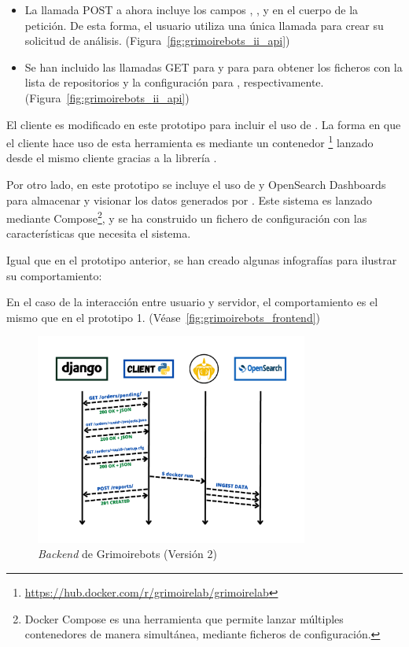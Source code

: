 \begin{itemize}
    \item La llamada POST a  ahora incluye los campos , , y  en el cuerpo de la petición. De esta forma, el usuario utiliza una única llamada para crear su solicitud de análisis. (Figura~\ref{fig:grimoirebots_ii_api})
    \item Se han incluido las llamadas GET para  y para  para obtener los ficheros con la lista de repositorios y la configuración para , respectivamente. (Figura~\ref{fig:grimoirebots_ii_api})
\end{itemize}

El cliente es modificado en este prototipo para incluir el uso de . La forma en que el cliente hace uso de esta herramienta es mediante un contenedor \footnote{\url{https://hub.docker.com/r/grimoirelab/grimoirelab}} lanzado desde el mismo cliente gracias a la librería .

Por otro lado, en este prototipo se incluye el uso de  y OpenSearch Dashboards para almacenar y visionar los datos generados por . Este sistema es lanzado mediante  Compose\footnote{Docker Compose es una herramienta que permite lanzar múltiples contenedores de manera simultánea, mediante ficheros de configuración.}, y se ha construido un fichero de configuración con las características que necesita el sistema.

Igual que en el prototipo anterior, se han creado algunas infografías para ilustrar su comportamiento:

En el caso de la interacción entre usuario y servidor, el comportamiento es el mismo que en el prototipo 1. (Véase~\ref{fig:grimoirebots_frontend})

\begin{figure}[ht]
    \centering
    \includegraphics[width=0.8\textwidth]{Figures/grimoirebots_ii_backend}
    \decoRule
    \caption[Grimoirebots II (\emph{Backend})]{\emph{Backend} de Grimoirebots (Versión 2)}
    \label{fig:grimoirebots_ii_backend}
\end{figure}

